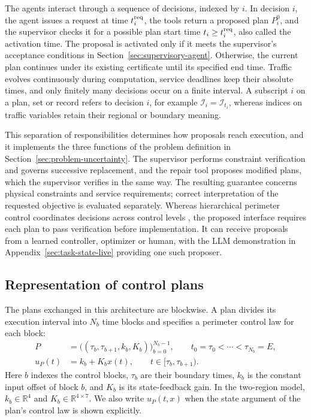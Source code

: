 \documentclass[final]{cas-sc}
\theoremstyle{definition}
\theoremstyle{plain}
\theoremstyle{definition}
\theoremstyle{plain}
\newcommand{\R}{\mathbb{R}}
\newcommand{\appref}[1]{Appendix~\ref{#1}}
\begin{document}
The agents interact through a sequence of decisions, indexed by $i$.
In decision $i$, the agent issues a request at time $t_i^{\rm req}$,
the tools return a proposed plan $P_i^{0}$, and the supervisor checks
it for a possible plan start time $t_i\ge t_i^{\rm req}$, also called
the activation time. The proposal is activated only if it meets the
supervisor's acceptance conditions in Section~\ref{sec:supervisory-agent}.
Otherwise, the current plan continues under its existing certificate
until its specified end time. Traffic evolves continuously during
computation, service deadlines keep their absolute times, and only
finitely many decisions occur on a finite interval. A subscript $i$ on
a plan, set or record refers to decision $i$, for example
$\mathcal I_i=\mathcal I_{t_i}$, whereas indices on traffic variables
retain their regional or boundary meaning.

This separation of responsibilities determines how proposals reach
execution, and it implements the three functions of the problem
definition in Section~\ref{sec:problem-uncertainty}. The supervisor performs
constraint verification and governs successive replacement, and the
repair tool proposes modified plans, which the supervisor verifies in
the same way. The resulting guarantee concerns physical constraints
and service requirements; correct interpretation of the requested
objective is evaluated separately. Whereas hierarchical perimeter
control coordinates decisions across control levels
\cite{ramezani2015heterogeneity,su2023hierarchical}, the proposed interface
requires each plan to pass verification before implementation. It can
receive proposals from a learned controller, optimizer or human, with
the LLM demonstration in \appref{sec:task-state-live} providing one
such proposer.

\subsection{Representation of control plans}
\label{sec:control-plans}

The plans exchanged in this architecture are blockwise. A plan divides
its execution interval into $N_b$ time blocks and specifies a
perimeter control law for each block:
\begin{equation}
\begin{aligned}
P&=\big((\tau_b,\tau_{b+1},k_b,K_b)\big)_{b=0}^{N_b-1},
\qquad t_0=\tau_0<\cdots<\tau_{N_b}=E,\\
u_P(t)&=k_b+K_bx(t),\qquad t\in[\tau_b,\tau_{b+1}).
\end{aligned}
\label{eq:control-plan-tuple}
\end{equation}
Here $b$ indexes the control blocks, $\tau_b$ are their boundary
times, $k_b$ is the constant input offset of block $b$, and $K_b$ is
its state-feedback gain. In the two-region model, $k_b\in\R^{4}$ and
$K_b\in\R^{4\times7}$. We also write $u_P(t,x)$ when the state
argument of the plan's control law is shown explicitly.
\end{document}
